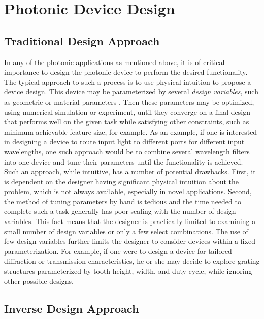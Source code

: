 \section{Photonic Device Design}

\subsection{Traditional Design Approach}

In any of the photonic applications as mentioned above, it is of critical importance to design the photonic device to perform the desired functionality.
The typical approach to such a process is to use physical intuition to propose a device design.
This device may be parameterized by several \textit{design variables}, such as geometric or material parameters \cite{hughes_plasmonic_2016}.
Then these parameters may be optimized, using numerical simulation or experiment, until they converge on a final design that performs well on the given task while satisfying other constraints, such as minimum achievable feature size, for example.
As an example, if one is interested in designing a device to route input light to different ports for different input wavelengths, one such approach would be to combine several wavelength filters into one device and tune their parameters until the functionality is achieved.
Such an approach, while intuitive, has a number of potential drawbacks.
First, it is dependent on the designer having significant physical intuition about the problem, which is not always available, especially in novel applications.
Second, the method of tuning parameters by hand is tedious and the time needed to complete such a task generally has poor scaling with the number of design variables.
This fact means that the designer is practically limited to examining a small number of design variables or only a few select combinations.
The use of few design variables further limits the designer to consider devices within a fixed parameterization.
For example, if one were to design a device for tailored diffraction or transmission characteristics, he or she may decide to explore grating structures parameterized by tooth height, width, and duty cycle, while ignoring other possible designs.

\subsection{Inverse Design Approach}


